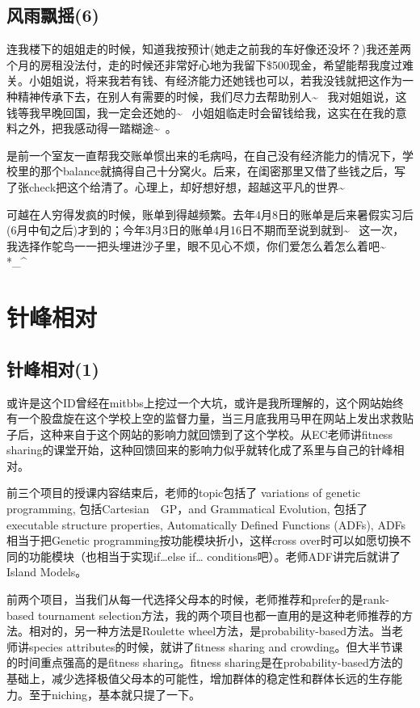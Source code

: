 \documentclass[12pt]{book}
\begin{document}
\section{风雨飘摇(6)}
\label{sec-33-6}

连我楼下的姐姐走的时候，知道我按预计(她走之前我的车好像还没坏？)我还差两个月的房租没法付，走的时候还非常好心地为我留下\$500现金，希望能帮我度过难关。小姐姐说，将来我若有钱、有经济能力还她钱也可以，若我没钱就把这作为一种精神传承下去，在别人有需要的时候，我们尽力去帮助别人\textasciitilde{}~ 我对姐姐说，这钱等我早晚回国，我一定会还她的\textasciitilde{}~ 小姐姐临走时会留钱给我，这实在在我的意料之外，把我感动得一踏糊途\textasciitilde{}~。

是前一个室友一直帮我交账单惯出来的毛病吗，在自己没有经济能力的情况下，学校里的那个balance就搞得自己十分窝火。后来，在闺密那里又借了些钱之后，写了张check把这个给清了。心理上，却好想好想，超越这平凡的世界\textasciitilde{}~

可越在人穷得发疯的时候，账单到得越频繁。去年4月8日的账单是后来暑假实习后(6月中旬之后)才到的；今年3月3日的账单4月16日不期而至说到就到\textasciitilde{}~ 这一次，我选择作鸵鸟一一把头埋进沙子里，眼不见心不烦，你们爱怎么着怎么着吧\textasciitilde{}~  *\_\^{}

\chapter{针峰相对}
\label{sec-34}
\section{针峰相对(1)}
\label{sec-34-1}

或许是这个ID曾经在mitbbs上挖过一个大坑，或许是我所理解的，这个网站始终有一个股盘旋在这个学校上空的监督力量，当三月底我用马甲在网站上发出求救贴子后，这种来自于这个网站的影响力就回馈到了这个学校。从EC老师讲fitness sharing的课堂开始，这种回馈回来的影响力似乎就转化成了系里与自己的针峰相对。

前三个项目的授课内容结束后，老师的topic包括了 variations of genetic programming, 包括Cartesian　GP，and Grammatical Evolution, 包括了executable structure properties, Automatically Defined Functions (ADFs), ADFs相当于把Genetic programming按功能模块折小，这样cross over时可以如愿切换不同的功能模块（也相当于实现if\ldots{}else if\ldots{} conditions吧）。老师ADF讲完后就讲了Island Models。

前两个项目，当我们从每一代选择父母本的时候，老师推荐和prefer的是rank-based tournament selection方法，我的两个项目也都一直用的是这种老师推荐的方法。相对的，另一种方法是Roulette wheel方法，是probability-based方法。当老师讲species attributes的时候，就讲了fitness sharing and crowding。但大半节课的时间重点强高的是fitness sharing。fitness sharing是在probability-based方法的基础上，减少选择极值父母本的可能性，增加群体的稳定性和群体长远的生存能力。至于niching，基本就只提了一下。
\end{document}
